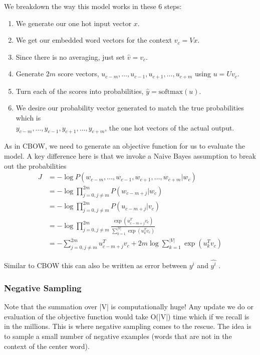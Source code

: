 \documentclass[12pt]{article}
\begin{document}
            We breakdown the way this model works in these 6 steps:
            \begin{enumerate}
                \item We generate our one hot input vector $x$.
                \item We get our embedded word vectors for the context $v_c = Vx$.
                \item Since there is no averaging, just set $\hat{v} = v_c$.
                \item Generate $2m$ score vectors, $u_{c-m}, \ldots, u_{c-1}, u_{c+1}, \ldots, u_{c+m}$ using $u = Uv_c$.
                \item Turn each of the scores into probabilities, $\hat{y} = \text{softmax}(u)$.
                \item We desire our probability vector generated to match the true probabilities which is \\
                 $y_{c-m}, \ldots, y_{c-1}, y_{c+1}, \ldots, y_{c+m}$, the one hot vectors of the actual output.
            \end{enumerate}
            
            As in CBOW, we need to generate an objective function for us to
            evaluate the model. A key difference here is that we invoke a Naive
            Bayes assumption to break out the probabilities
            \begin{align*}
                J &= - \log P(w_{c-m}, \ldots, w_{c-1}, w_{c+1}, \ldots, w_{c+m}|w_c) \\
                &= - \log \prod_{j=0, j \neq m}^{2m} P(w_{c-m+j}|w_c) \\
                &= - \log \prod_{j=0, j \neq m}^{2m} P(u_{c-m+j}|v_c) \\
                &= - \log \prod_{j=0, j \neq m}^{2m} \frac{\exp(u_{c-m+j}^T v_c)}{\sum_{k=1}^{|V|} \exp(u_k^T v_c)} \\
                &= - \sum_{j=0, j \neq m}^{2m} u_{c-m+j}^T v_c + 2m \log \sum_{k=1}^{|V|} \exp(u_k^T v_c)
            \end{align*}

            Similar to CBOW this can also be written as error between $y^i$ and $\hat{y^i}$ .
        \subsubsection{Negative Sampling}
        Note that the
        summation over |V| is computationally huge! Any update we do or
        evaluation of the objective function would take O(|V|) time which
        if we recall is in the millions. This is where negative sampling comes
        to the rescue. The idea is to sample a small number of negative
        examples (words that are not in the context of the center word).
\end{document}
